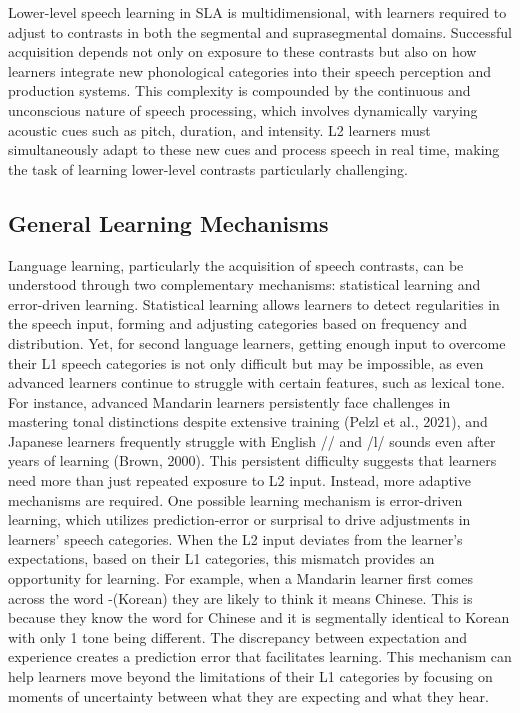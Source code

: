 Lower-level speech learning in SLA is multidimensional, with learners required to adjust to contrasts in both the segmental and suprasegmental domains. Successful acquisition depends not only on exposure to these contrasts but also on how learners integrate new phonological categories into their speech perception and production systems. This complexity is compounded by the continuous and unconscious nature of speech processing, which involves dynamically varying acoustic cues such as pitch, duration, and intensity. L2 learners must simultaneously adapt to these new cues and process speech in real time, making the task of learning lower-level contrasts particularly challenging.



\subsection{General Learning Mechanisms}

Language learning, particularly the acquisition of speech contrasts, can be understood through two complementary mechanisms: statistical learning and error-driven learning. Statistical learning allows learners to detect regularities in the speech input, forming and adjusting categories based on frequency and distribution. Yet, for second language learners, getting enough input to overcome their L1 speech categories is not only difficult but may be impossible, as even advanced learners continue to struggle with certain features, such as lexical tone. For instance, advanced Mandarin learners persistently face challenges in mastering tonal distinctions despite extensive training (Pelzl et al., 2021), and Japanese learners frequently struggle with English // and /l/ sounds even after years of learning (Brown, 2000). This persistent difficulty suggests that learners need more than just repeated exposure to L2 input. Instead, more adaptive mechanisms are required. One possible learning mechanism is error-driven learning, which utilizes prediction-error or surprisal to drive adjustments in learners' speech categories. When the L2 input deviates from the learner's expectations, based on their L1 categories, this mismatch provides an opportunity for learning. For example, when a Mandarin learner first comes across the word -(Korean) they are likely to think it means Chinese. This is because they know the word for Chinese  and it is segmentally identical to Korean with only 1 tone being different. The discrepancy between expectation and experience creates a prediction error that facilitates learning. This mechanism can help learners move beyond the limitations of their L1 categories by focusing on moments of uncertainty between what they are expecting and what they hear.

